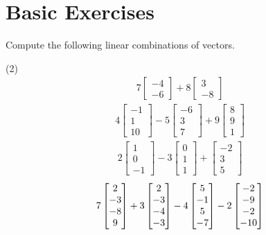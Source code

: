 \section{Basic Exercises}

Compute the following linear combinations of vectors.
\begin{tasks}[style=enumerate](2)
\task
  \begin{align*}
    7 \left[\begin{matrix}-4\\-6\end{matrix}\right] + 8 \left[\begin{matrix}3\\-8\end{matrix}\right]
  \end{align*}
\task
  \begin{align*}
    4 \left[\begin{matrix}-1\\1\\10\end{matrix}\right] - 5 \left[\begin{matrix}-6\\3\\7\end{matrix}\right] + 9 \left[\begin{matrix}8\\9\\1\end{matrix}\right]
  \end{align*}
\task
  \begin{align*}
    2 \left[\begin{matrix}1\\0\\-1\end{matrix}\right] - 3 \left[\begin{matrix}0\\1\\1\end{matrix}\right] + \left[\begin{matrix}-2\\3\\5\end{matrix}\right]
  \end{align*}
\task
  \begin{displaymath}
    7  \begin{bmatrix} 2 \\ -3 \\ -8 \\ 9 \end{bmatrix} 
    + 3  \begin{bmatrix} 2 \\ -3 \\ -4 \\ -3 \end{bmatrix} 
    - 4  \begin{bmatrix} 5 \\ -1 \\ 5 \\ -7 \end{bmatrix} 
    - 2  \begin{bmatrix} -2 \\ -9 \\ -2 \\ -10 \end{bmatrix} 
  \end{displaymath}
\end{tasks}
